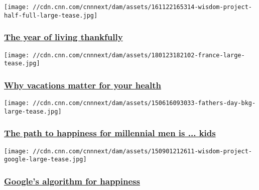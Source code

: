 \href{/2016/11/23/health/thankfulness-wisdom-project/index.html}{}

\texttt{[image: //cdn.cnn.com/cnnnext/dam/assets/161122165314-wisdom-project-half-full-large-tease.jpg]}

\hypertarget{the-year-of-living-thankfully}{%
\subsubsection{\texorpdfstring{\href{/2016/11/23/health/thankfulness-wisdom-project/index.html}{The
year of living
thankfully}}{The year of living thankfully}}\label{the-year-of-living-thankfully}}

\href{/travel/article/why-vacations-matter/index.html}{}

\texttt{[image: //cdn.cnn.com/cnnnext/dam/assets/180123182102-france-large-tease.jpg]}

\hypertarget{why-vacations-matter-for-your-health}{%
\subsubsection{\texorpdfstring{\href{/travel/article/why-vacations-matter/index.html}{Why
vacations matter for your
health}}{Why vacations matter for your health}}\label{why-vacations-matter-for-your-health}}

\href{/2016/06/17/health/millennial-fathers-happiness-work-life-balance-study/index.html}{}

\texttt{[image: //cdn.cnn.com/cnnnext/dam/assets/150616093033-fathers-day-bkg-large-tease.jpg]}

\hypertarget{the-path-to-happiness-for-millennial-men-is--kids-}{%
\subsubsection{\texorpdfstring{\href{/2016/06/17/health/millennial-fathers-happiness-work-life-balance-study/index.html}{The
path to happiness for millennial men is ... kids
}}{The path to happiness for millennial men is ... kids }}\label{the-path-to-happiness-for-millennial-men-is--kids-}}

\href{/2015/09/30/health/google-happiness/index.html}{}

\texttt{[image: //cdn.cnn.com/cnnnext/dam/assets/150901212611-wisdom-project-google-large-tease.jpg]}

\hypertarget{googles-algorithm-for-happiness}{%
\subsubsection{\texorpdfstring{\href{/2015/09/30/health/google-happiness/index.html}{Google's
algorithm for
happiness}}{Google's algorithm for happiness}}\label{googles-algorithm-for-happiness}}

